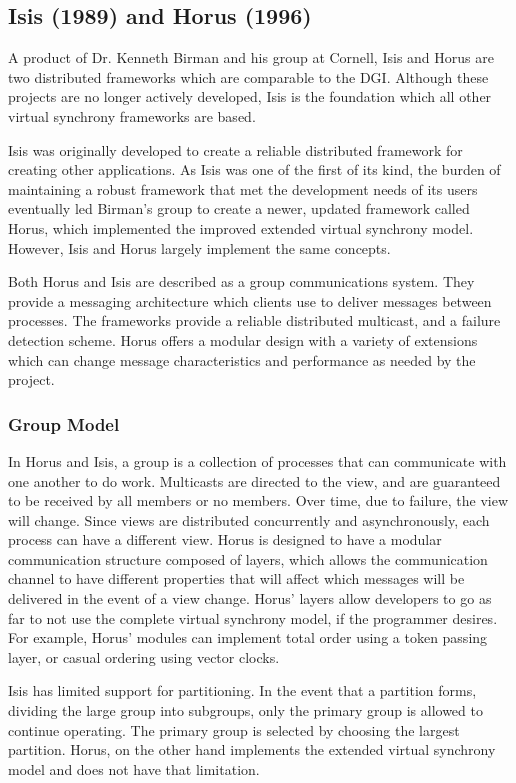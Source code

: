\subsection{Isis (1989) and Horus (1996)}

A product of Dr. Kenneth Birman and his group at Cornell, Isis \cite{ISISTOOLKIT} and Horus \cite{HORUSTOOLKIT} are two distributed frameworks which are comparable to the DGI. Although these projects are no longer actively developed, Isis is the foundation which all other virtual synchrony frameworks are based.

Isis was originally developed to create a reliable distributed framework for creating other applications. As Isis was one of the first of its kind, the burden of maintaining a robust framework that met the development needs of its users eventually led Birman's group to create a newer, updated framework called Horus, which implemented the improved extended virtual synchrony model. However, Isis and Horus largely implement the same concepts.

Both Horus and Isis are described as a group communications system. They provide a messaging architecture which clients use to deliver messages between processes. The frameworks provide a reliable distributed multicast, and a failure detection scheme. Horus offers a modular design with a variety of extensions which can change message characteristics and performance as needed by the project.

\subsubsection{Group Model}
In Horus and Isis, a group is a collection of processes that can communicate with one another to do work. Multicasts are directed to the view, and are guaranteed to be received by all members or no members.
Over time, due to failure, the view will change. Since views are distributed concurrently and asynchronously, each process can have a different view. Horus is designed to have a modular communication structure composed of layers, which allows the communication channel to have different properties that will affect which messages will be delivered in the event of a view change. Horus' layers allow developers to go as far to not use the complete virtual synchrony model, if the programmer desires. For example, Horus' modules can implement total order using a token passing layer, or casual ordering using vector clocks.

Isis has limited support for partitioning. In the event that a partition forms, dividing the large group into subgroups, only the primary group is allowed to continue operating. The primary group is selected by choosing the largest partition. Horus, on the other hand implements the extended virtual synchrony model and does not have that limitation.

